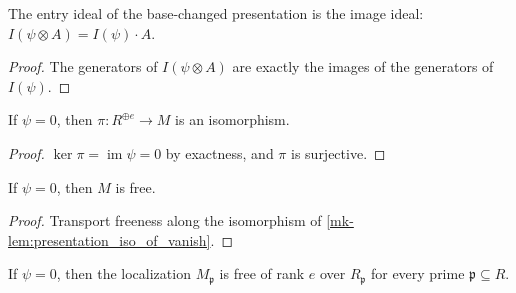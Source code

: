 \begin{lemma}
  \label{mk-lem:entry_ideal_base_change}
  \leanok

  The entry ideal of the base-changed presentation is the image ideal:
  \(I(\psi \otimes A) = I(\psi) \cdot A\).
\end{lemma}

\begin{proof}
  \leanok
  The generators of \(I(\psi \otimes A)\) are exactly the images of the
  generators of \(I(\psi)\).
\end{proof}

\begin{lemma}
  \label{mk-lem:presentation_iso_of_vanish}
  \leanok

  If \(\psi = 0\), then \(\pi : R^{\oplus e} \to M\) is an isomorphism.
\end{lemma}

\begin{proof}
  \leanok
  \(\ker \pi = \operatorname{im} \psi = 0\) by exactness, and \(\pi\) is
  surjective.
\end{proof}

\begin{lemma}
  \label{mk-lem:presentation_free_of_vanish}
  \leanok

  If \(\psi = 0\), then \(M\) is free.
\end{lemma}

\begin{proof}
  \leanok
  Transport freeness along the isomorphism of
  \ref{mk-lem:presentation_iso_of_vanish}.
\end{proof}

\begin{lemma}
  \label{mk-lem:presentation_rank_of_vanish}
  \leanok

  If \(\psi = 0\), then the localization \(M_{\mathfrak p}\) is free of rank
  \(e\) over \(R_{\mathfrak p}\) for every prime
  \(\mathfrak p \subseteq R\).
\end{lemma}

